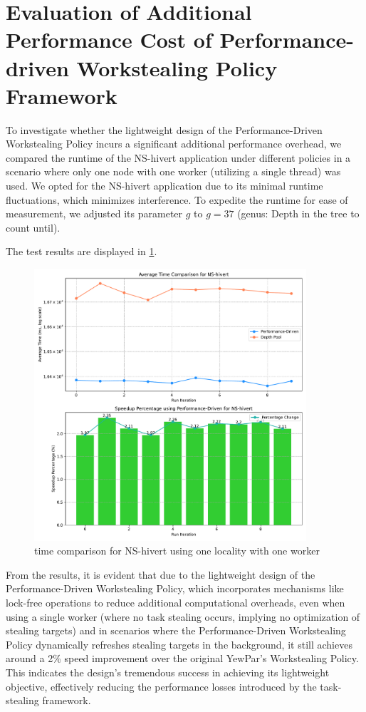 \documentclass{mproj}
\begin{document}
\section{Evaluation of Additional Performance Cost of Performance-driven Workstealing Policy Framework}

To investigate whether the lightweight design of the Performance-Driven Workstealing Policy incurs a significant additional performance overhead,
we compared the runtime of the NS-hivert application under different policies in a scenario where only one node with one worker (utilizing a single thread) was used.
We opted for the NS-hivert application due to its minimal runtime fluctuations, which minimizes interference.
To expedite the runtime for ease of measurement,
we adjusted its parameter \( g \) to \( g = 37 \) (genus: Depth in the tree to count until).

The test results are displayed in \ref{fig:time_comparison_ns_one_worker}.
\begin{figure}[h]
    \centering
    \includegraphics[width=0.9\textwidth]{images/time_comparison_ns_one_worker.pdf}
    \caption{time comparison for NS-hivert using one locality with one worker}
    \label{fig:time_comparison_ns_one_worker}
\end{figure}
\FloatBarrier

From the results, it is evident that due to the lightweight design of the Performance-Driven Workstealing Policy,
which incorporates mechanisms like lock-free operations to reduce additional computational overheads,
even when using a single worker (where no task stealing occurs, implying no optimization of stealing targets)
and in scenarios where the Performance-Driven Workstealing Policy dynamically refreshes stealing targets in the background,
it still achieves around a 2\% speed improvement over the original YewPar's Workstealing Policy.
This indicates the design's tremendous success in achieving its lightweight objective,
effectively reducing the performance losses introduced by the task-stealing framework.
\end{document}
